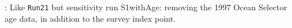 : Like {\tt Run21} but sensitivity run S1withAge: removing the 1997 Ocean Selector age data, in addition to the survey index point. \newline






